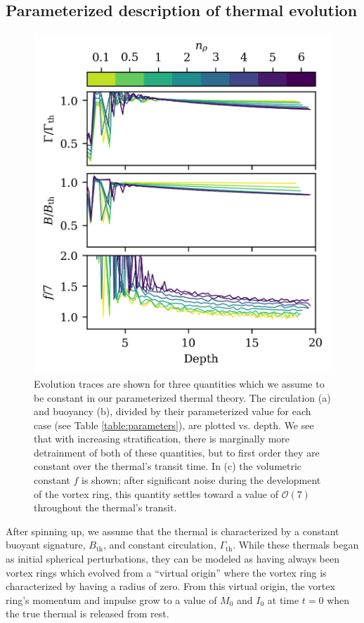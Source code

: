 \documentclass[twocolumn, amsmath, amsfonts, amssymb, trackchanges]{aastex62}
\begin{document}
\subsection{Parameterized description of thermal evolution}
\begin{figure}[t!]
    \includegraphics[width=\columnwidth]{constants.png}
    \caption{
	Evolution traces are shown for  three quantities which we assume to be constant in our parameterized thermal theory. 
	The circulation (a) and buoyancy (b), divided by their parameterized value for each case (see Table \ref{table:parameters}), are plotted vs. depth. 
	We see that with increasing stratification, there is marginally more detrainment of both of these quantities, but to first order they are constant over the	thermal's transit time. 
	In (c) the volumetric constant $f$ is shown; after significant noise during the development of the vortex ring, this quantity settles toward a value of $\mathcal{O}(7)$ throughout the thermal's transit.
    \label{fig:constants} }
\end{figure}

After spinning up, we assume that the thermal is characterized by a constant buoyant signature, $B_{\text{th}}$, and constant circulation, $\Gamma_{\text{th}}$.
While these thermals began as initial spherical perturbations, they can be modeled as having always been vortex rings which evolved from a ``virtual origin'' where the vortex ring is characterized by having a radius of zero. 
From this virtual origin, the vortex ring's momentum and impulse grow to a value of $M_0$ and $I_0$ at time $t = 0$ when the true thermal is released from rest.
\end{document}
